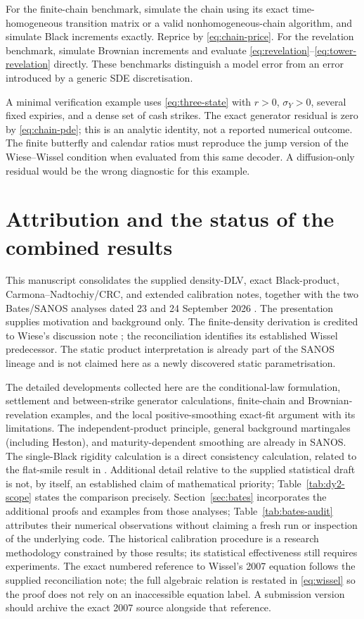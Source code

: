 \documentclass[11pt,a4paper]{article}
\numberwithin{equation}{section}
\theoremstyle{definition}\newtheorem{definition}[theorem]{Definition}
\theoremstyle{remark}\newtheorem{remark}[theorem]{Remark}
\begin{document}
For the finite-chain benchmark, simulate the chain using its exact time-homogeneous transition matrix or a valid nonhomogeneous-chain algorithm, and simulate Black increments exactly. Reprice by \eqref{eq:chain-price}. For the revelation benchmark, simulate Brownian increments and evaluate \eqref{eq:revelation}--\eqref{eq:tower-revelation} directly. These benchmarks distinguish a model error from an error introduced by a generic SDE discretisation.

A minimal verification example uses \eqref{eq:three-state} with $r>0$, $\sigma_Y>0$, several fixed expiries, and a dense set of cash strikes. The exact generator residual is zero by \eqref{eq:chain-pde}; this is an analytic identity, not a reported numerical outcome. The finite butterfly and calendar ratios must reproduce the jump version of the Wiese--Wissel condition when evaluated from this same decoder. A diffusion-only residual would be the wrong diagnostic for this example.

\section{Attribution and the status of the combined results}
This manuscript consolidates the supplied density-DLV, exact Black-product, Carmona--Nadtochiy/CRC, and extended calibration notes, together with the two Bates/SANOS analyses dated 23 and 24 September 2026 \cite{BatesCompatibility,FiniteSANOS}. The presentation supplies motivation and background only. The finite-density derivation is credited to Wiese's discussion note \cite{WieseNote}; the reconciliation identifies its established Wissel predecessor. The static product interpretation is already part of the SANOS lineage and is not claimed here as a newly discovered static parametrisation.

The detailed developments collected here are the conditional-law formulation, settlement and between-strike generator calculations, finite-chain and Brownian-revelation examples, and the local positive-smoothing exact-fit argument with its limitations. The independent-product principle, general background martingales (including Heston), and maturity-dependent smoothing are already in SANOS. The single-Black rigidity calculation is a direct consistency calculation, related to the flat-smile result in \cite{SSVI}. Additional detail relative to the supplied statistical draft is not, by itself, an established claim of mathematical priority; Table~\ref{tab:dy2-scope} states the comparison precisely. Section~\ref{sec:bates} incorporates the additional proofs and examples from those analyses; Table~\ref{tab:bates-audit} attributes their numerical observations without claiming a fresh run or inspection of the underlying code. The historical calibration procedure is a research methodology constrained by those results; its statistical effectiveness still requires experiments. The exact numbered reference to Wissel's 2007 equation follows the supplied reconciliation note; the full algebraic relation is restated in \eqref{eq:wissel} so the proof does not rely on an inaccessible equation label. A submission version should archive the exact 2007 source alongside that reference.
\appendix
\end{document}
